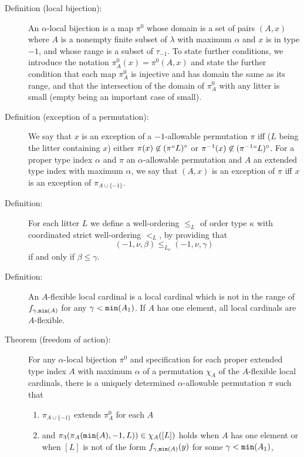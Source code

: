 \documentclass[112pt]{article}
\begin{document}
\begin{description}

\item[Definition (local bijection):]  An $\alpha$-local bijection is a map $\pi^0$ whose domain is a set of pairs $(A,x)$ where $A$ is a nonempty finite subset of $\lambda$ with maximum $\alpha$ and $x$ is in type $-1$,  and whose range is a subset of $\tau_{-1}$.  To state further conditions, we introduce the notation $\pi^0_A(x) = \pi^0(A,x)$ and state the further condition that each map $\pi^0_A$ is injective and has domain the same as its range, and that the intersection of the domain of $\pi^0_A$ with any litter is small (empty being an important case of small).

\item[Definition (exception of a permutation):]  We say that $x$ is an exception of a $-1$-allowable permutation $\pi$ iff ($L$ being the litter containing $x$) either $\pi(x) \not\in (\pi``L)^\circ$ or $\pi^{-1}(x) \not\in (\pi^{-1}``L)^\circ$.  For a proper type index $\alpha$ and $\pi$ an $\alpha$-allowable permutation and $A$ an extended type index with maximum $\alpha$, we say that $(A,x)$ is an exception of $\pi$ iff
$x$ is an exception of $\pi_{A \cup \{-1\}}$.

\item[Definition:]  For each litter $L$ we define a well-ordering $\leq_L$ of order type $\kappa$ with coordinated strict well-ordering $<_L$, by providing that $$(-1,\nu,\beta)\leq_{L_\nu} (-1,\nu,\gamma)$$ if and only if $\beta\leq \gamma$.

\item[Definition:]  An $A$-flexible local cardinal is a local cardinal
which is not in the range of $f_{\gamma,{\tt min}(A)}$ for any $\gamma<{\tt min}(A_1)$.  If $A$ has one element, all local cardinals are $A$-flexible.

\item[Theorem (freedom of action):]  For any $\alpha$-local bijection $\pi^0$ 
and specification for each proper extended type index $A$ with maximum $\alpha$ of a permutation $\chi_A$ of the $A$-flexible local cardinals,
there is a uniquely determined $\alpha$-allowable permutation $\pi$ such that

\begin{enumerate}

\item $\pi_{A\cup \{-1\}}$ extends $\pi^0_A$ for each $A$ 

\item and $\pi_3(\pi_A({\tt min}(A),-1,L))\in \chi_A([L])$ holds when $A$ has one element or when $[L]$ is  not of the form $f_{\gamma,{\tt min}(A)}(y)$ for some $\gamma<{\tt min}(A_1)$, 


\end{enumerate}
\end{description}
\end{document}
